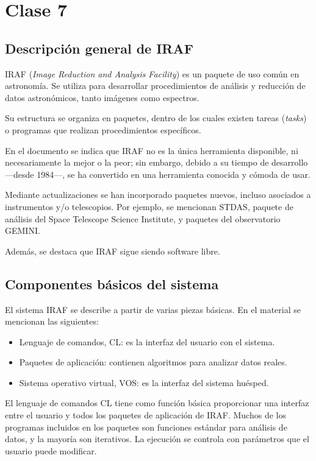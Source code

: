 \chapter{Clase 7}

\section{Descripción general de IRAF}

IRAF (\textit{Image Reduction and Analysis Facility}) es un paquete de uso común en astronomía. Se utiliza para desarrollar procedimientos de análisis y reducción de datos astronómicos, tanto imágenes como espectros.

Su estructura se organiza en paquetes, dentro de los cuales existen tareas (\textit{tasks}) o programas que realizan procedimientos específicos.

En el documento se indica que IRAF no es la única herramienta disponible, ni necesariamente la mejor o la peor; sin embargo, debido a su tiempo de desarrollo ---desde 1984---, se ha convertido en una herramienta conocida y cómoda de usar.

Mediante actualizaciones se han incorporado paquetes nuevos, incluso asociados a instrumentos y/o telescopios. Por ejemplo, se mencionan STDAS, paquete de análisis del Space Telescope Science Institute, y paquetes del observatorio GEMINI.

Además, se destaca que IRAF sigue siendo software libre.

\section{Componentes básicos del sistema}

El sistema IRAF se describe a partir de varias piezas básicas. En el material se mencionan las siguientes:

\begin{itemize}
    \item Lenguaje de comandos, CL: es la interfaz del usuario con el sistema.
    \item Paquetes de aplicación: contienen algoritmos para analizar datos reales.
    \item Sistema operativo virtual, VOS: es la interfaz del sistema huésped.
\end{itemize}

El lenguaje de comandos CL tiene como función básica proporcionar una interfaz entre el usuario y todos los paquetes de aplicación de IRAF. Muchos de los programas incluidos en los paquetes son funciones estándar para análisis de datos, y la mayoría son iterativos. La ejecución se controla con parámetros que el usuario puede modificar.


